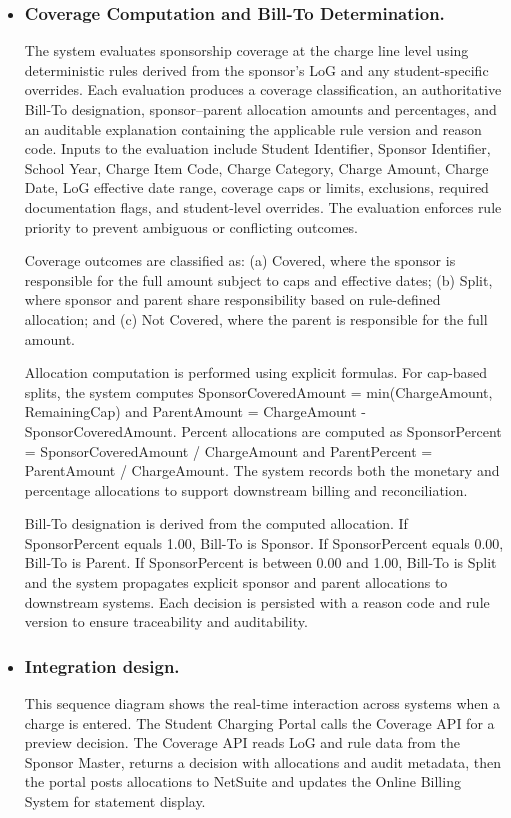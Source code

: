 \begin{itemize}
            \item \subsubsection{Coverage Computation and Bill-To Determination.} The system evaluates sponsorship coverage at the charge line level using deterministic rules derived from the sponsor’s LoG and any student-specific overrides. Each evaluation produces a coverage classification, an authoritative Bill-To designation, sponsor–parent allocation amounts and percentages, and an auditable explanation containing the applicable rule version and reason code.
            Inputs to the evaluation include Student Identifier, Sponsor Identifier, School Year, Charge Item Code, Charge Category, Charge Amount, Charge Date, LoG effective date range, coverage caps or limits, exclusions, required documentation flags, and student-level overrides. The evaluation enforces rule priority to prevent ambiguous or conflicting outcomes.
            
            Coverage outcomes are classified as: (a) Covered, where the sponsor is responsible for the full amount subject to caps and effective dates; (b) Split, where sponsor and parent share responsibility based on rule-defined allocation; and (c) Not Covered, where the parent is responsible for the full amount.
            
            Allocation computation is performed using explicit formulas. For cap-based splits, the system computes SponsorCoveredAmount = min(ChargeAmount, RemainingCap) and ParentAmount = ChargeAmount - SponsorCoveredAmount. Percent allocations are computed as SponsorPercent = SponsorCoveredAmount / ChargeAmount and ParentPercent = ParentAmount / ChargeAmount. The system records both the monetary and percentage allocations to support downstream billing and reconciliation.
            
            Bill-To designation is derived from the computed allocation. If SponsorPercent equals 
            1.00, Bill-To is Sponsor. If SponsorPercent equals 0.00, Bill-To is Parent. If SponsorPercent is between 0.00 and 1.00, Bill-To is Split and the system propagates explicit sponsor and parent allocations to downstream systems. Each decision is persisted with a reason code and rule version to ensure traceability and auditability.
 
            \item \subsubsection{Integration design.} This sequence diagram shows the real-time interaction across systems when a charge is entered. The Student Charging Portal calls the Coverage API for a preview decision. The Coverage API reads LoG and rule data from the Sponsor Master, returns a decision with allocations and audit metadata, then the portal posts allocations to NetSuite and updates the Online Billing System for statement display.
            

\end{itemize}
